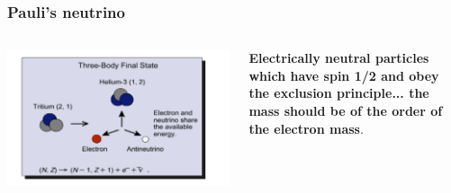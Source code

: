 \begin{frame}
\frametitle{Pauli's neutrino}
\begin{columns}
\includegraphics[scale=0.4]{img/pauli-neutrino.png}
 
\begin{block}{}
{\bf Electrically neutral particles which have spin 1/2 and obey the exclusion principle... the mass should be of the order of the electron mass}. 
\end{block}
\end{columns}
\end{frame}

